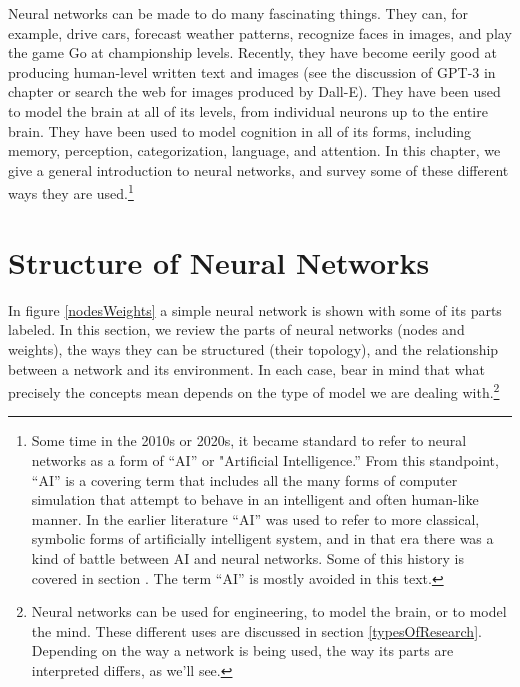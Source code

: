 Neural networks can be made to do many fascinating things. They can, for example, drive cars, forecast weather patterns, recognize faces in images, and play the game Go at championship levels. Recently, they have become eerily good at producing human-level written text and images (see the discussion of GPT-3 in chapter  or search the web for images produced by Dall-E). They have been used to model the brain at all of its levels, from individual neurons up to the entire brain. They have been used to model cognition in all of its forms, including memory, perception, categorization, language, and attention. In this chapter, we give a general introduction to neural networks, and survey some of these different ways they are used.\footnote{Some time in the 2010s or 2020s, it became standard to refer to neural networks as a form of ``AI'' or "Artificial Intelligence.''  From this standpoint, ``AI'' is a covering term that includes all the many forms of computer simulation that attempt to behave in an intelligent and often human-like manner.  In the earlier literature ``AI'' was used to refer to more classical, symbolic forms of artificially intelligent system, and in that era there was a kind of battle between AI and neural networks. Some of this history is covered in section .  The term ``AI'' is mostly avoided in this text.}

\section{Structure of Neural Networks}\label{structureNets}

In figure \ref{nodesWeights} a simple neural network is shown with some of its parts labeled. In this section, we review the parts of neural networks (nodes and weights), the ways they can be structured (their topology), and the relationship between a network and its environment. In each case, bear in mind that what precisely the concepts mean depends on the type of model we are dealing with.\footnote{Neural networks can be used for engineering, to model the brain, or to model the mind. These different uses are discussed in section \ref{typesOfResearch}. Depending on the way a network is being used, the way its parts are interpreted differs, as we'll see.} 

